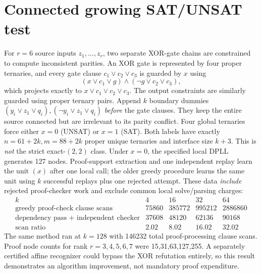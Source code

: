 \documentclass[11pt]{article}
\begin{document}
\section{Connected growing SAT/UNSAT test}
For $r=6$ source inputs $z_1,\ldots,z_r$, two separate XOR-gate chains are constrained to compute inconsistent parities. An XOR gate is represented by four proper ternaries, and every gate clause $c_1\vee c_2\vee c_3$ is guarded by $x$ using
\[
(x\vee c_1\vee g)\land(\neg g\vee c_2\vee c_3),
\]
which projects exactly to $x\vee c_1\vee c_2\vee c_3$. The output constraints are similarly guarded using proper ternary pairs. Append $k$ boundary dummies $(y_i\vee z_1\vee q_i),(\neg y_i\vee z_1\vee q_i)$ \emph{before} the gate clauses. They keep the entire source connected but are irrelevant to its parity conflict. Four global ternaries force either $x=0$ (UNSAT) or $x=1$ (SAT). Both labels have exactly $n=61+2k,m=88+2k$ proper unique ternaries and interface size $k+3$. This is \emph{not} the strict exact-$(2,2)$ class.
Under $x=0$, the specified local DPLL generates 127 nodes. Proof-support extraction and one independent replay learn the unit $(x)$ after one local call; the older greedy procedure learns the same unit using $k$ successful replays plus one rejected attempt. These data \emph{include} rejected proof-checker work and exclude common local solve/parsing charges:
\[
\begin{array}{c|rrrr}
k&4&16&32&64\\\hline
\text{greedy proof-check clause scans}&75860&385772&995212&2886860\\
\text{dependency pass + independent checker}&37608&48120&62136&90168\\
\text{scan ratio}&2.02&8.02&16.02&32.02
\end{array}
\]
The same method ran at $k=128$ with 146232 total proof-processing clause scans. Proof node counts for rank $r=3,4,5,6,7$ were 15,31,63,127,255. A separately certified affine recognizer could bypass the XOR refutation entirely, so this result demonstrates an algorithm improvement, not mandatory proof expenditure.
\end{document}
